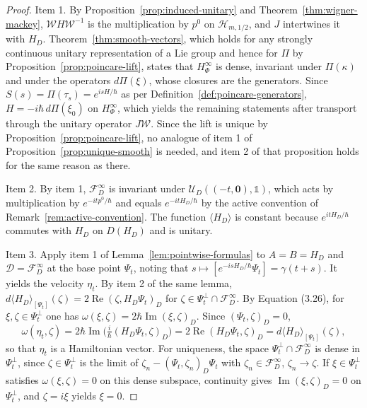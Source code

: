 \begin{proof}
	Item 1. By Proposition~\ref{prop:induced-unitary} and Theorem~\ref{thm:wigner-mackey}, $\mathcal{W}H\mathcal{W}^{-1}$ is the multiplication by $p^0$ on $\mathcal{H}_{m,1/2}$, and $J$ intertwines it with $H_D$. Theorem~\ref{thm:smooth-vectors}, which holds for any strongly continuous unitary representation of a Lie group and hence for $\Pi$ by Proposition~\ref{prop:poincare-lift}, states that $H^\infty_\Phi$ is dense, invariant under $\Pi(\kappa)$ and under the operators $d\Pi(\xi)$, whose closures are the generators. Since $S(s)=\Pi(\tau_s)=e^{isH/\hbar}$ as per Definition~\ref{def:poincare-generators}, $H=-i\hbar\,d\Pi(\xi_0)$ on $H^\infty_\Phi$, which yields the remaining statements after transport through the unitary operator $J\mathcal{W}$. Since the lift is unique by Proposition~\ref{prop:poincare-lift}, no analogue of item 1 of Proposition~\ref{prop:unique-smooth} is needed, and item 2 of that proposition holds for the same reason as there.
	
	Item 2. By item 1, $\mathcal{F}_D^\infty$ is invariant under $\mathcal{U}_D((-t,\mathbf{0}),\mathbb{1})$, which acts by multiplication by $e^{-itp^0/\hbar}$ and equals $e^{-itH_D/\hbar}$ by the active convention of Remark~\ref{rem:active-convention}. The function $\langle H_D\rangle$ is constant because $e^{itH_D/\hbar}$ commutes with $H_D$ on $D(H_D)$ and is unitary.
	
	Item 3. Apply item 1 of Lemma~\ref{lem:pointwise-formulas} to $A=B=H_D$ and $\mathcal{D}=\mathcal{F}_D^\infty$ at the base point $\Psi_t$, noting that $s\mapsto[e^{-isH_D/\hbar}\Psi_t]=\gamma(t+s)$. It yields the velocity $\eta_t$. By item 2 of the same lemma, $d\langle H_D\rangle_{[\Psi_t]}(\zeta)=2\operatorname{Re}(\zeta,H_D\Psi_t)_D$ for $\zeta\in\Psi_t^\perp\cap\mathcal{F}_D^\infty$. By Equation (3.26), for $\xi,\zeta\in\Psi_t^\perp$ one has $\omega(\xi,\zeta)=2\hbar\operatorname{Im}(\xi,\zeta)_D$. Since $(\Psi_t,\zeta)_D=0$,
	\begin{equation*}
		\omega(\eta_t,\zeta)=2\hbar\operatorname{Im}\Big(\tfrac{i}{\hbar}(H_D\Psi_t,\zeta)_D\Big)=2\operatorname{Re}(H_D\Psi_t,\zeta)_D=d\langle H_D\rangle_{[\Psi_t]}(\zeta),
	\end{equation*}
	so that $\eta_t$ is a Hamiltonian vector. For uniqueness, the space $\Psi_t^\perp\cap\mathcal{F}_D^\infty$ is dense in $\Psi_t^\perp$, since $\zeta\in\Psi_t^\perp$ is the limit of $\zeta_n-(\Psi_t,\zeta_n)_D\Psi_t$ with $\zeta_n\in\mathcal{F}_D^\infty$, $\zeta_n\to\zeta$. If $\xi\in\Psi_t^\perp$ satisfies $\omega(\xi,\zeta)=0$ on this dense subspace, continuity gives $\operatorname{Im}(\xi,\zeta)_D=0$ on $\Psi_t^\perp$, and $\zeta=i\xi$ yields $\xi=0$.
	

\end{proof}
